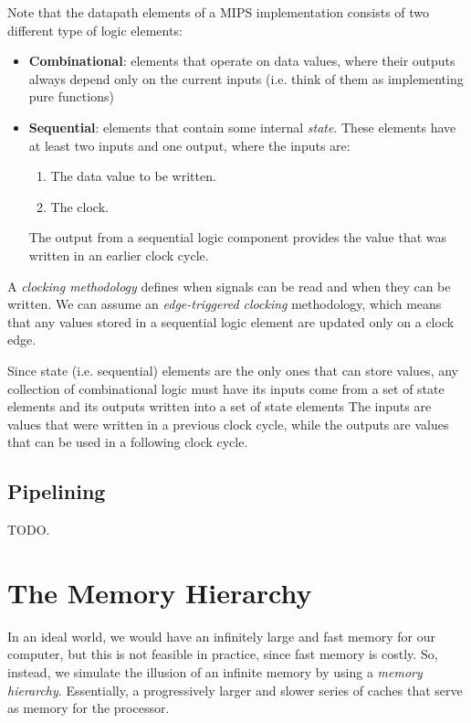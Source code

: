 \documentclass[10pt,a4paper]{article}
\begin{document}
Note that the datapath elements of a MIPS implementation consists of two different type of logic elements:
\begin{itemize}
    \item \textbf{Combinational}: elements that operate on data values, where their outputs always depend only on the current inputs (i.e. think of them as implementing pure functions)
    \item \textbf{Sequential}: elements that contain some internal \textit{state}. These elements have at least two inputs and one output, where the inputs are:
    \begin{enumerate}
        \item The data value to be written.
        \item The clock.
    \end{enumerate}
    The output from a sequential logic component provides the value that was written in an earlier clock cycle.
\end{itemize}
A \textit{clocking methodology} defines when signals can be read and when they can be written. We can assume an \textit{edge-triggered clocking} methodology, which means that any values stored in a sequential logic element are updated only on a clock edge. 

Since state (i.e. sequential) elements are the only ones that can store values, any collection of combinational logic must have its inputs come from a set of state elements and its outputs written into a set of state elements The inputs are values that were written in a previous clock cycle, while the outputs are values that can be used in a following clock cycle.

\subsection{Pipelining}

TODO.

\section{The Memory Hierarchy}

In an ideal world, we would have an infinitely large and fast memory for our computer, but this is not feasible in practice, since fast memory is costly. So, instead, we simulate the illusion of an infinite memory by using a \textit{memory hierarchy}. Essentially, a progressively larger and slower series of caches that serve as memory for the processor.
\end{document}
